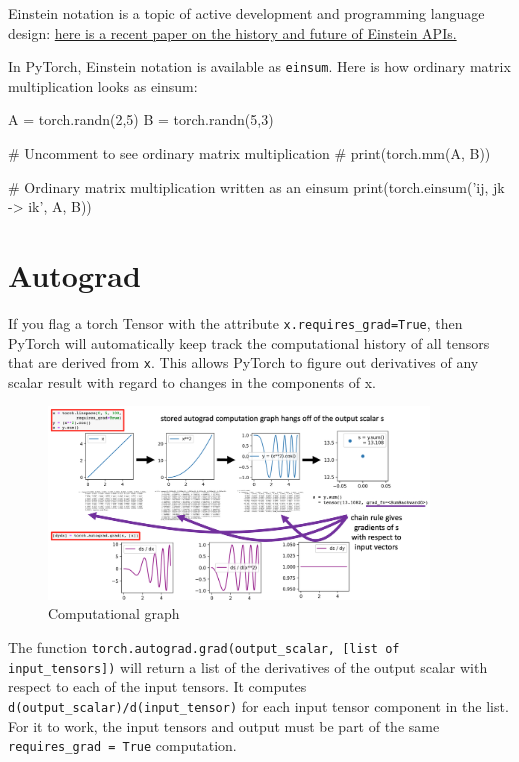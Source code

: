 Einstein notation is a topic of active development and programming language design: \href{https://openreview.net/pdf?id=oapKSVM2bcj}{here is a recent paper on the history and future of Einstein APIs.}

In PyTorch, Einstein notation is available as \texttt{einsum}. Here is how ordinary matrix multiplication looks as einsum:

\begin{exampleblock}[Einsum]
    \begin{codeblock}[language=python]
A = torch.randn(2,5)
B = torch.randn(5,3)

# Uncomment to see ordinary matrix multiplication
# print(torch.mm(A, B))

# Ordinary matrix multiplication written as an einsum
print(torch.einsum('ij, jk -> ik', A, B))
    \end{codeblock}
\end{exampleblock}





\newpage
\section{Autograd}

If you flag a torch Tensor with the attribute \texttt{x.requires\_grad=True}, then PyTorch will automatically keep track the computational history of all tensors that are derived from \texttt{x}. This allows PyTorch to figure out derivatives of any scalar result with regard to changes in the components of x. 

\begin{figure}[H]
    \centering
    \includegraphics[width=0.9\textwidth]{assets/autograd-graph.png}
    \caption{Computational graph}
\end{figure}

The function \texttt{torch.autograd.grad(output\_scalar, [list of input\_tensors])} will return a list of the derivatives of the output scalar with respect to each of the input tensors. It computes \texttt{d(output\_scalar)/d(input\_tensor)} for each input tensor component in the list. For it to work, the input tensors and output must be part of the same \texttt{requires\_grad = True} computation. 

